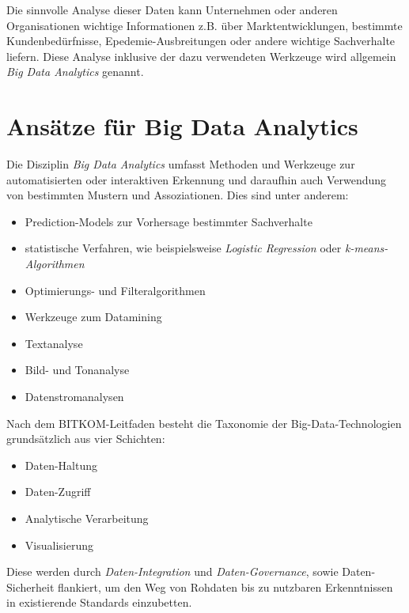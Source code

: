 Die sinnvolle Analyse dieser Daten kann Unternehmen oder anderen Organisationen wichtige Informationen z.B. über Marktentwicklungen, bestimmte Kundenbedürfnisse, Epedemie-Ausbreitungen oder andere wichtige Sachverhalte liefern. Diese Analyse inklusive der dazu verwendeten Werkzeuge wird allgemein \textit{Big Data Analytics} genannt. 



\section{Ansätze für Big Data Analytics}
\label{section:ansaetze für Big Data Analytics}


Die Disziplin \textit{Big Data Analytics} umfasst Methoden und Werkzeuge zur automatisierten oder interaktiven Erkennung und daraufhin auch Verwendung von bestimmten Mustern und Assoziationen. Dies sind unter anderem:

\begin{itemize}
		\item Prediction-Models zur Vorhersage bestimmter Sachverhalte
		\item statistische Verfahren, wie beispielsweise \textit{Logistic Regression} oder \textit{k-means-Algorithmen} 
		\item Optimierungs- und Filteralgorithmen 
		\item Werkzeuge zum Datamining
		\item Textanalyse
		\item Bild- und Tonanalyse
		\item Datenstromanalysen
\end{itemize}	



Nach dem BITKOM-Leitfaden  besteht die Taxonomie der Big-Data-Technologien grundsätzlich aus vier Schichten:


\begin{itemize}
		\item Daten-Haltung
		\item Daten-Zugriff 
		\item Analytische Verarbeitung
		\item Visualisierung
\end{itemize}	


Diese werden durch \textit{Daten-Integration} und \textit{Daten-Governance}, sowie Daten-Sicherheit flankiert, um den Weg von Rohdaten bis zu nutzbaren Erkenntnissen in existierende Standards einzubetten.

